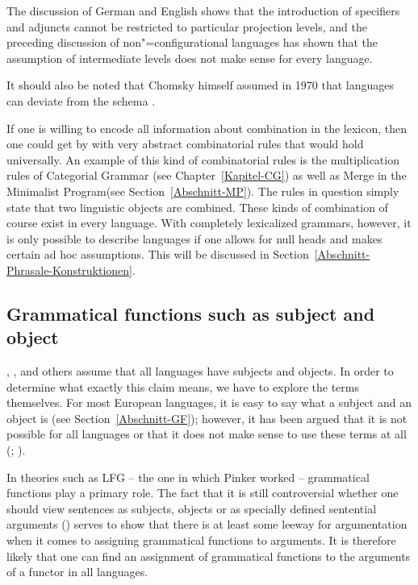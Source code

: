 The discussion of German and English shows that the introduction of specifiers and adjuncts cannot be restricted to particular projection levels, and
the preceding discussion of non"=configurational languages has shown that the assumption of intermediate levels does not make sense for every language.

It should also be noted that Chomsky himself assumed in 1970 that languages can deviate from the \xbar
schema \citeyearpar[]{Chomsky70a}.

If one is willing to encode all information about combination in the lexicon, then one could get by with very abstract combinatorial rules that would hold universally.
An example of this kind of combinatorial rules is the multiplication rules of Categorial Grammar (see Chapter~\ref{Kapitel-CG}) 
as well as Merge in the Minimalist Program\indexmp (see Section~\ref{Abschnitt-MP}).
The rules in question simply state that two linguistic objects are combined. These kinds of
combination of course exist in every language. With completely lexicalized grammars, however, it is only possible to describe languages
if one allows for null heads and makes certain ad hoc assumptions. This will be discussed in
Section~\ref{Abschnitt-Phrasale-Konstruktionen}. 

\subsection{Grammatical functions such as subject and object}
\label{Abschnitt-UG-EPP}

\mbox{}\citet[\page xxv]{BK82a}, \citet[--237]{Pinker94a}, \citet[]{Baker2003b} 
and others assume that all languages have subjects and objects. In order to determine what exactly this claim means, we have to explore the terms
themselves. For most European languages, it is easy to say what a subject and an object is (see Section~\ref{Abschnitt-GF}); however,
it has been argued that it is not possible for all languages or that it does not make sense to use
these terms at all (\citealp[Chapter~4]{Croft2001a}; \citealp[Section~4]{EL2009a}).

In theories such as LFG\indexlfg{} -- the one in which Pinker worked -- grammatical functions play a primary role. The fact that it is still
controversial whether one should view sentences as subjects, objects or as specially defined sentential arguments (\xcomp) \citep*{DL2000a-u,Berman2003b-u,Berman2007a-u,AMM2005a-u,Forst2006a-u}
serves to show that there is at least some leeway for argumentation when it comes to assigning
grammatical functions to arguments. It is therefore likely that one can find an assignment of
grammatical functions to the arguments of a functor in all languages. 

